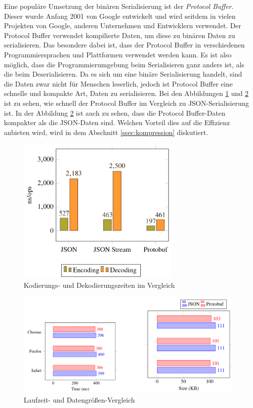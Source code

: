 Eine populäre Umsetzung der binären Serialisierung ist der \textit{Protocol Buffer}. Dieser wurde Anfang 2001 von Google entwickelt und wird seitdem in vielen Projekten von Google, anderen Unternehmen und Entwicklern verwendet. Der Protocol Buffer verwendet kompilierte Daten, um diese zu binären Daten zu serialisieren. Das besondere dabei ist, dass der Protocol Buffer in verschiedenen Programmiersprachen und Plattformen verwendet werden kann. Es ist also möglich, dass die Programmierumgebung beim Serialisieren ganz anders ist, als die beim Deserialisieren. Da es sich um eine binäre Serialisierung handelt, sind die Daten zwar nicht für Menschen leserlich, jedoch ist Protocol Buffer eine schnelle und kompakte Art, Daten zu serialisieren. Bei den Abbildungen \ref{fig:protobufTime} und \ref{fig:protobufBrowser} ist zu sehen, wie schnell der Protocol Buffer im Vergleich zu JSON-Serialisierung ist.  In der Abbildung \ref{fig:protobufBrowser} ist auch zu sehen, dass die Protocol Buffer-Daten kompakter als die JSON-Daten sind. Welchen Vorteil dies auf die Effizienz anbieten wird, wird in dem Abschnitt \ref{ssec:kompression} diskutiert.\cite{currier2022protocol}

\begin{figure}[htp]
    \centering
    \includegraphics[width=0.7\textwidth]{images/protobuf_time.png}
    \caption{Kodierungs- und Dekodierungszeiten im Vergleich\cite{currier2022protocol}}
    \label{fig:protobufTime}
\end{figure}

\begin{figure}[htp]
    \centering
    \includegraphics[width=1\textwidth]{images/protobuf_browser.png}
    \caption{Laufzeit- und Datengrößen-Vergleich\cite{currier2022protocol}}
    \label{fig:protobufBrowser}
\end{figure}

